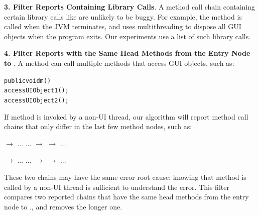 



\textbf{3. Filter Reports Containing Library Calls}. A
method call chain containing certain library calls
like  are unlikely to
be buggy. For example, the 
method is called when the JVM terminates, and uses multithreading
to dispose all GUI objects when the program exits.
Our experiments use a list of \libnum such library calls.

\textbf{4. Filter Reports with the Same Head Methods from the Entry Node to }. A method can call
multiple methods that access GUI objects, such as:

\pagebreak[3]
\vspace{-2mm}                   %
\begin{CodeOut}
\begin{alltt}
     public void m() \ttlcb
         accessUIObject1();
         accessUIObject2();
     \ttrcb
\end{alltt}
\end{CodeOut}
\vspace{-2mm}
If method  is invoked by a non-UI thread, our algorithm will
report method call chains that
only differ in the last few method nodes, such as:

 $\rightarrow$ ... ... $\rightarrow$  $\rightarrow$  ...

 $\rightarrow$ ... ... $\rightarrow$  $\rightarrow$  ...

\noindent
These two chains may have the same error root cause: knowing that
method  is called by a non-UI thread is sufficient to understand
the error.
This filter compares two reported chains that have the same
head methods from the entry node to .,
and removes the longer one.

